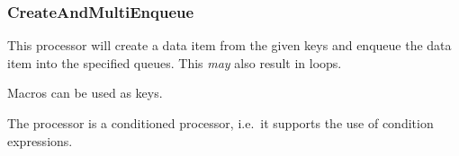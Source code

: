 \subsubsection{CreateAndMultiEnqueue}

This processor will create a data item from the given keys and enqueue
the data item into the specified queues. This \emph{may} also result in
loops.

Macros can be used as keys.

The processor is a conditioned processor, i.e.~it supports the use of
condition expressions.

\begin{table}[h]
\end{table}
